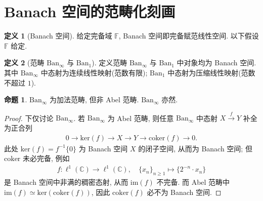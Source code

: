 \documentclass{MainStyle}
\theoremstyle{definition}
\theoremstyle{definition}
\theoremstyle{definition}
\newtheorem{definition}{定义}
\theoremstyle{definition}
\newtheorem{proposition}{命题}
\theoremstyle{definition}
\theoremstyle{definition}
\theoremstyle{definition}
\theoremstyle{remark}
\theoremstyle{remark}
\begin{document}
\maketitle
\section{Banach 空间的范畴化刻画}

\begin{definition}[Banach 空间]
    给定完备域 $\mathbb F$, Banach 空间即完备赋范线性空间. 以下假设 $\mathbb F$ 给定.
\end{definition}

\begin{definition}[范畴 $\mathrm{Ban}_\infty$ 与 $\mathrm{Ban}_1$]
    定义范畴 $\mathrm{Ban}_\infty$ 与 $\mathrm{Ban}_1$ 中对象均为 Banach 空间. 其中 $\mathrm{Ban}_\infty$ 中态射为连续线性映射(范数有限); $\mathrm{Ban}_1$ 中态射为压缩线性映射(范数不超过 $1$).
\end{definition}

\begin{proposition}
    $\mathrm{Ban}_\infty$ 为加法范畴, 但非 Abel 范畴. $\mathrm{Ban}_\infty$ 亦然.
    \begin{proof}
        下仅讨论 $\mathrm{Ban}_\infty$. 若 $\mathrm{Ban}_\infty$ 为 Abel 范畴, 则任意 $\mathrm{Ban}_\infty$ 中态射 $X\overset f\to Y$ 补全为正合列
        \begin{align*}
            0\to \mathrm{ker}(f)\to X\to Y\to \mathrm{coker}(f)\to 0.
        \end{align*}
        此处 $\mathrm{ker}(f)=f^{-1}\{0\}$ 为 Banach 空间 $X$ 的闭子空间, 从而为 Banach 空间; 但 $\mathrm{coker}$ 未必完备, 例如
        \begin{align*}
            f:\ell^1(\mathbb C)\to \ell^1(\mathbb C),\quad \{x_n\}_{n\geq 1}\mapsto \{2^{-n}\cdot x_n\}
        \end{align*}
        是 Banach 空间中非满的稠密态射, 从而 $\mathrm{im}(f)$ 不完备. 而 Abel 范畴中 $\mathrm{im}(f)\simeq \mathrm{ker}(\mathrm{coker}(f))$, 因此 $\mathrm{coker}(f)$ 必不为 Banach 空间.
    \end{proof}
\end{proposition}
\end{document}
